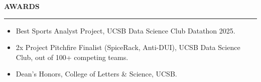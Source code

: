\documentclass[letterpaper,10pt]{article}
\newcommand{\resumeSection}[1]{%
  \vspace{3pt}%
  {\large\bfseries #1}\par
  \vspace{-4pt}\rule{\linewidth}{0.4pt}\par
  \vspace{1pt}%
}
\newenvironment{bullets}{\begin{itemize}}{\end{itemize}\vspace{1pt}}
\begin{document}
\resumeSection{AWARDS}
\begin{bullets}
  \item Best Sports Analyst Project, UCSB Data Science Club Datathon 2025.
  \item 2x Project Pitchfire Finalist (SpiceRack, Anti-DUI), UCSB Data Science Club, out of 100+ competing teams.
  \item Dean's Honors, College of Letters \& Science, UCSB.
\end{bullets}
\end{document}
